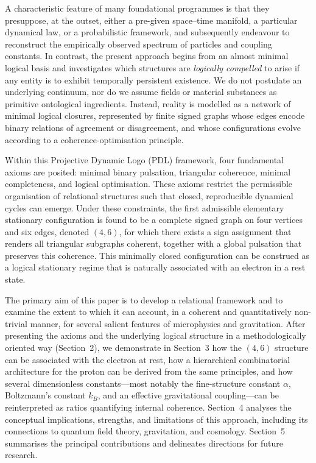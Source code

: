 \documentclass[11pt,a4paper]{article}
\begin{document}
A characteristic feature of many foundational programmes is that they presuppose, at the outset, either a pre-given space–time manifold, a particular dynamical law, or a probabilistic framework, and subsequently endeavour to reconstruct the empirically observed spectrum of particles and coupling constants. In contrast, the present approach begins from an almost minimal logical basis and investigates which structures are \emph{logically compelled} to arise if any entity is to exhibit temporally persistent existence. We do not postulate an underlying continuum, nor do we assume fields or material substances as primitive ontological ingredients. Instead, reality is modelled as a network of minimal logical closures, represented by finite signed graphs whose edges encode binary relations of agreement or disagreement, and whose configurations evolve according to a coherence-optimisation principle.

Within this Projective Dynamic Logo (PDL) framework, four fundamental axioms are posited: minimal binary pulsation, triangular coherence, minimal completeness, and logical optimisation. These axioms restrict the permissible organisation of relational structures such that closed, reproducible dynamical cycles can emerge. Under these constraints, the first admissible elementary stationary configuration is found to be a complete signed graph on four vertices and six edges, denoted \((4,6)\), for which there exists a sign assignment that renders all triangular subgraphs coherent, together with a global pulsation that preserves this coherence. This minimally closed configuration can be construed as a logical stationary regime that is naturally associated with an electron in a rest state.

The primary aim of this paper is to develop a relational framework and to examine the extent to which it can account, in a coherent and quantitatively non-trivial manner, for several salient features of microphysics and gravitation. After presenting the axioms and the underlying logical structure in a methodologically oriented way (Section~2), we demonstrate in Section~3 how the \((4,6)\) structure can be associated with the electron at rest, how a hierarchical combinatorial architecture for the proton can be derived from the same principles, and how several dimensionless constants—most notably the fine-structure constant \(\alpha\), Boltzmann's constant \(k_B\), and an effective gravitational coupling—can be reinterpreted as ratios quantifying internal coherence. Section~4 analyses the conceptual implications, strengths, and limitations of this approach, including its connections to quantum field theory, gravitation, and cosmology. Section~5 summarises the principal contributions and delineates directions for future research.
\end{document}
